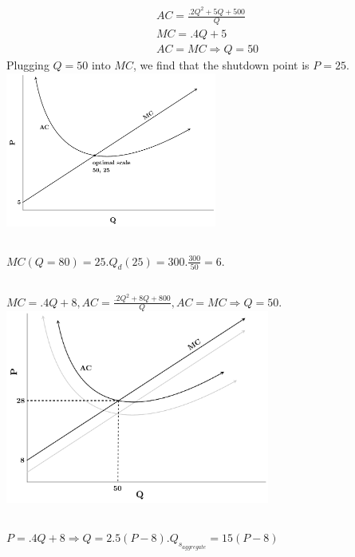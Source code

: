 \documentclass{article}
\begin{document}
\section[7]{}
	\subsection[a]{}
		\begin{align*}
			AC = \frac{.2Q^2+5Q+500}{Q} \\
			MC = .4Q +5 \\
			AC = MC \Rightarrow Q= 50
		\end{align*}
		Plugging $ Q = 50$ into $MC$, we find that the shutdown point is $P=25.$ \\
		\includegraphics[height=2in]{Charts/7a}
	\subsection[b]{}
		$MC(Q=80) = 25. Q_d(25) = 300. \frac{300}{50} = 6. $
	\subsection[c]{}
		$MC = .4Q + 8, AC = \frac{.2Q^2+8Q + 800}{Q}, AC=MC \Rightarrow Q=50. $\\
		\includegraphics[height=2.5in]{Charts/7c}
	\subsection[d]{}
		$ P = .4Q + 8 \Rightarrow Q = 2.5(P-8). Q_{s_{aggregate}} = 15(P-8) $
\end{document}
